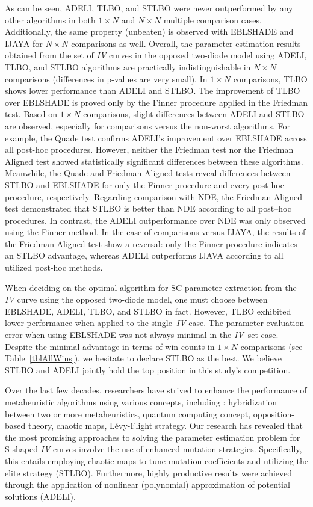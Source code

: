 \documentclass[a4paper,fleqn]{cas-sc}
\begin{document}
As can be seen, ADELI, TLBO, and STLBO were never outperformed by any other algorithms
in both  $1\times N$ and $N\times N$ multiple comparison cases.
Additionally, the same property (unbeaten) is observed with EBLSHADE and IJAYA for $N\times N$ comparisons as well.
Overall, the parameter estimation results obtained from the set of \emph{IV} curves
in the opposed two-diode model using ADELI, TLBO, and STLBO algorithms
are practically indistinguishable in $N\times N$  comparisons
(differences in p-values are very small).
In $1\times N$ comparisons, TLBO shows lower performance than ADELI and STLBO.
The improvement of TLBO over EBLSHADE is proved only by the Finner procedure applied in the Friedman test.
Based on $1\times N$ comparisons, slight differences between
ADELI and STLBO are observed, especially for comparisons versus the non-worst algorithms.
For example, the Quade test confirms ADELI's improvement
over EBLSHADE across all post-hoc procedures.
However, neither the Friedman test nor the Friedman Aligned test showed
statistically significant differences between these algorithms.
Meanwhile, the Quade and  Friedman Aligned tests reveal differences between STLBO and EBLSHADE
for only the Finner procedure and every post-hoc procedure, respectively.
Regarding comparison with NDE, the Friedman Aligned test demonstrated
that STLBO is better than NDE according to all post--hoc procedures.
In contrast, the ADELI outperformance over NDE was only observed using the Finner method.
In the case of comparisons versus IJAYA,
the results of the Friedman Aligned test show a reversal:
only the Finner procedure indicates an STLBO advantage,
whereas ADELI outperforms IJAVA according to all utilized post-hoc methods.



When deciding on the optimal algorithm for SC parameter extraction from
the \emph{IV} curve using the opposed two-diode model,
one must choose between EBLSHADE, ADELI, TLBO, and STLBO in fact.
However, TLBO exhibited lower performance when applied to the single--\emph{IV} case.
The parameter evaluation error when using EBLSHADE was not always minimal in the \emph{IV}--set case.
Despite the minimal advantage in terms of win counts in $1\times N$ comparisons
(see Table~\ref{tblAllWins}),
we hesitate to declare STLBO as the best.
We believe STLBO and ADELI jointly hold the top position in this study's competition.


Over the last few decades, researchers have strived to enhance the performance of metaheuristic algorithms using various concepts, including \cite{Kepler}:
hybridization between two or more metaheuristics, quantum computing concept, opposition-based theory, chaotic maps,  L\'{e}vy-Flight strategy.
Our research has revealed that the most promising approaches to solving
the parameter estimation problem for S-shaped \emph{IV} curves involve the use of enhanced mutation strategies.
Specifically, this entails employing chaotic maps to tune mutation coefficients and utilizing the elite strategy (STLBO).
Furthermore, highly productive results were achieved through the application of nonlinear (polynomial) approximation of potential solutions (ADELI).
\end{document}
